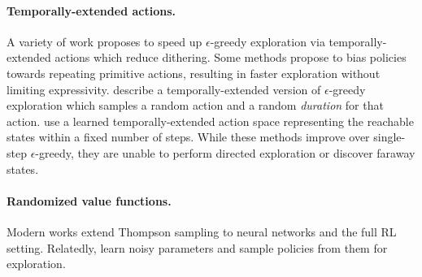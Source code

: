 \paragraph{Temporally-extended actions.}
A variety of work proposes to speed up $\epsilon$-greedy exploration via temporally-extended actions which reduce dithering.
Some methods \citep{Schoknecht2003ReinforcementLO,neunert2020continuousdiscrete} propose to bias policies towards repeating primitive actions, resulting in faster exploration without limiting expressivity.
\citet{Dabney2020TemporallyExtendedE} describe a temporally-extended version of $\epsilon$-greedy exploration which samples a random action and a random \emph{duration} for that action.
\citet{Whitney2020DynamicsawareE} use a learned temporally-extended action space representing the reachable states within a fixed number of steps.
While these methods improve over single-step $\epsilon$-greedy, they are unable to perform directed exploration or discover faraway states.


\paragraph{Randomized value functions.}
Modern works \citep{Osband2016DeepEV,osband2019deep} extend Thompson sampling \citep{thompson1933likelihood} to neural networks and the full RL setting.
Relatedly, \citep{Fortunato2018NoisyNF,Plappert2018ParameterSN} learn noisy parameters and sample policies from them for exploration.


